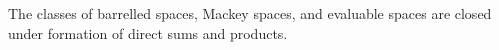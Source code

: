The classes of barrelled spaces, Mackey spaces, and evaluable spaces are closed under formation of direct sums and products.
